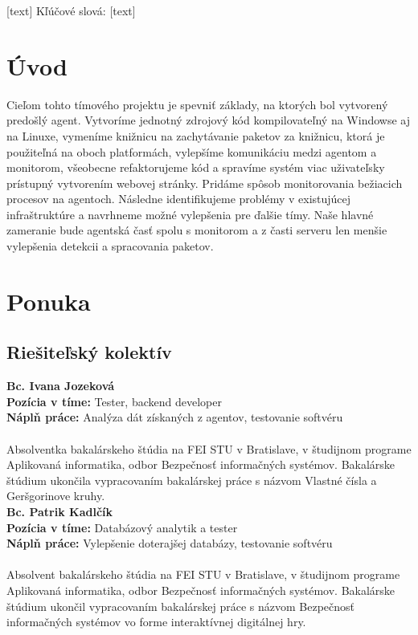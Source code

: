 \documentclass[a4paper,12pt]{article}
\begin{document}
[text]
\newline \newline
Kľúčové slová: [text]
\newpage

\renewcommand{\contentsname}{Obsah}
\tableofcontents
\newpage
\renewcommand{\listfigurename}{Zoznam obrázkov}
\listoffigures
\newpage


\section*{Úvod}
\setcounter{page}{1}
\pagestyle{plain}
Cieľom tohto tímového projektu je spevniť základy, na ktorých bol vytvorený predošlý agent. Vytvoríme jednotný zdrojový kód kompilovateľný na Windowse aj na Linuxe, vymeníme knižnicu na zachytávanie paketov za knižnicu, ktorá je použiteľná na oboch platformách, vylepšíme komunikáciu medzi agentom a monitorom, všeobecne refaktorujeme kód a spravíme systém viac uživateľsky prístupný vytvorením webovej stránky. Pridáme spôsob monitorovania bežiacich procesov na agentoch. Následne identifikujeme problémy v existujúcej infraštruktúre a navrhneme možné vylepšenia pre ďalšie tímy. Naše hlavné zameranie bude agentská časť spolu s monitorom a z časti serveru len menšie vylepšenia detekcii a spracovania paketov. \\
\newpage

\section{Ponuka}
\subsection{Riešiteľský kolektív}
\textbf{Bc. Ivana Jozeková} \\
\textbf{Pozícia v tíme: } Tester, backend developer \\ 
\textbf{Náplň práce:} Analýza dát získaných z agentov, testovanie softvéru \\ \\
Absolventka bakalárskeho štúdia na FEI STU v Bratislave, v študijnom programe Aplikovaná informatika, odbor Bezpečnosť informačných systémov. Bakalárske štúdium ukončila vypracovaním bakalárskej práce s názvom Vlastné čísla a Geršgorinove kruhy. \\ 

\noindent \textbf{Bc. Patrik Kadlčík} \\
\textbf{Pozícia v tíme: } Databázový analytik a tester  \\
\textbf{Náplň práce:} Vylepšenie doterajšej databázy, testovanie softvéru \\ \\
Absolvent bakalárskeho štúdia na FEI STU v Bratislave, v študijnom programe Aplikovaná informatika, odbor Bezpečnosť informačných systémov. Bakalárske štúdium ukončil vypracovaním bakalárskej práce s názvom Bezpečnosť informačných systémov vo forme interaktívnej digitálnej hry. \\ 
\end{document}
